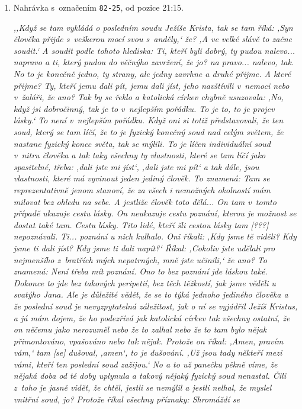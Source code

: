 \begin{enumerate}
\item{
Nahrávka s~označením \texttt{82-25}, od pozice 21:15.

\textit{%
,,Když se tam vykládá o posledním soudu Ježíše Krista, tak se tam říká: ,Syn
člověka přijde s~veškerou mocí svou s~anděly,` že? ,A ve velké slávě to začne
soudit.` A soudit podle tohoto hlediska: Ti, kteří byli dobrý, ty pudou
nalevo... napravo a ti, který pudou do věčnýho zavržení, že jo? na pravo...
nalevo, tak. No to je konečně jedno, ty strany, ale jedny zavrhne a druhé
přijme. A které přijme? Ty, kteří jemu dali pít, jemu dali jíst, jeho navštívili
v~nemoci nebo v~žaláři, že ano? Tak by se řeklo a katolická církev chybně
usuzovala: ,No, když jsi dobročinný, tak je to v~nejlepším pořádku. To je to, to
je projev lásky.` To není v~nejlepším pořádku. Když oni si totiž představovali,
že ten soud, který se tam líčí, že to je fyzický konečný soud nad celým světem,
že nastane fyzický konec světa, tak se mýlili. To je líčen individuální soud
v~nitru člověka a tak taky všechny ty vlastnosti, které se tam líčí jako
spasitelné, třeba: ,dali jste mi jíst`, ,dali jste mi pít` a tak dále, jsou
vlastnosti, které má vyvinout jeden jediný člověk. To znamená: Tam se
reprezentativně jenom stanoví, že za všech i nemožných okolností mám milovat bez
ohledu na sebe. A jestliže člověk toto dělá... On tam v~tomto případě ukazuje
cestu lásky. On neukazuje cestu poznání, kterou je možnost se dostat také tam.
Cestu lásky. Tito lidé, kteří šli cestou lásky tam [???] nepoznávali. Ti...
poznání u nich kulhalo. Oni říkali: ,Kdy jsme tě viděli? Kdy jsme ti dali jíst?
Kdy jsme ti dali napít?` Říkal: ,Cokoliv jste udělali pro nejmenšího z~bratřích
mých nepatrných, mně jste učinili,` že ano? To znamená: Není třeba mít poznání.
Ono to bez poznání jde láskou také. Dokonce to jde bez takových peripetií, bez
těch těžkostí, jak jsme věděli u svatýho Jana. Ale je důležité vědět, že se to
týká jednoho jediného člověka a že poslední soud je nevyzpytatelná záležitost,
jak o ní se vyjádřil Ježíš Kristus, a já mám dojem, že ho podezřívá jak
katolická církev tak všechny ostatní, že on něčemu jako nerozuměl nebo že to
zalhal nebo že to tam bylo nějak přimontováno, vpašováno nebo tak nějak. Protože
on říkal: ,Amen, pravím vám,` tam [se] dušoval, ,amen`, to je dušování. ,Už jsou
tady někteří mezi vámi, kteří ten poslední soud zažijou.` No a to už panečku
pěkně víme, že nějaká doba od té doby uplynula a takový nějaký fyzický soud
nenastal. Čili z~toho je jasně vidět, že chtěl, jestli se nemýlil a jestli
nelhal, že myslel vnitřní soud, jo? Protože říkal všechny příznaky: Shromáždí se
}}
\end{enumerate}
